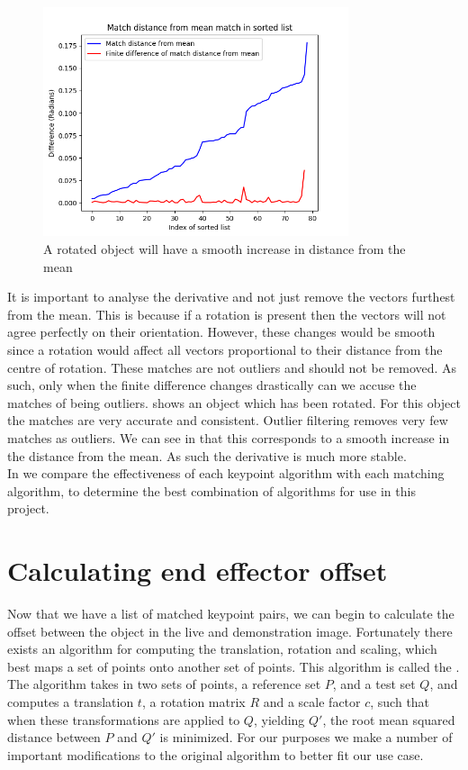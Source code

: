 \begin{figure}[h]
    \centering
    \includegraphics[width=0.8\textwidth]{figures/good-matches.png}
    \caption{A rotated object will have a smooth increase in distance from the mean}
    \label{fig:good-matches}
\end{figure}

It is important to analyse the derivative and not just remove the vectors furthest from the mean. This is because if a rotation is present then the vectors will not agree perfectly on their orientation. However, these changes would be smooth since a rotation would affect all vectors proportional to their distance from the centre of rotation. These matches are not outliers and should not be removed. As such, only when the finite difference changes drastically can we accuse the matches of being outliers.  shows an object which has been rotated. For this object the matches are very accurate and consistent. Outlier filtering removes very few matches as outliers. We can see in  that this corresponds to a smooth increase in the distance from the mean. As such the derivative is much more stable.\\

In  we compare the effectiveness of each keypoint algorithm with each matching algorithm, to determine the best combination of algorithms for use in this project.

\section{Calculating end effector offset}
\label{sec:kabsch}
Now that we have a list of matched keypoint pairs, we can begin to calculate the offset between the object in the live and demonstration image. Fortunately there exists an algorithm for computing the translation, rotation and scaling, which best maps a set of points onto another set of points. This algorithm is called the  \cite{kabsch}. The algorithm takes in two sets of points, a reference set $P$, and a test set $Q$, and computes a translation $t$, a rotation matrix $R$ and a scale factor $c$, such that when these transformations are applied to $Q$, yielding $Q'$, the root mean squared distance between $P$ and $Q'$ is minimized. For our purposes we make a number of important modifications to the original algorithm to better fit our use case.\\

